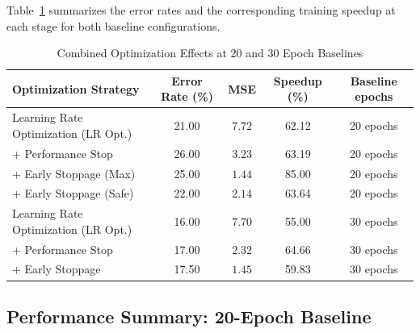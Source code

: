 Table~\ref{tab:combined_optimizations} summarizes the error rates and the corresponding training speedup at each stage for both baseline configurations.

\begin{table}[h!]
\centering
\begin{tabular}{|p{4.5cm}|c|c|c|c|}
\hline
\textbf{Optimization Strategy} & \textbf{Error Rate (\%)} & \textbf{MSE} & \textbf{Speedup (\%)} & \textbf{Baseline epochs} \\ \hline
Learning Rate Optimization (LR Opt.)         & 21.00  & \( 7.72  \) & 62.12 & 20 epochs \\ \hline
+ Performance Stop                           & 26.00 & \( 3.23  \)  & 63.19 & 20 epochs \\ \hline
+ Early Stoppage (Max)                       & 25.00 & \( 1.44  \)   & 85.00 & 20 epochs \\ \hline
+ Early Stoppage (Safe)                      & 22.00 & \( 2.14  \)  & 63.64 & 20 epochs \\ \hline
\hline
Learning Rate Optimization (LR Opt.)         & 16.00 & \( 7.70  \)  & 55.00 & 30 epochs \\ \hline
+ Performance Stop                           & 17.00 & \( 2.32  \)  & 64.66 & 30 epochs \\ \hline
+ Early Stoppage                             & 17.50 & \( 1.45  \)   & 59.83 & 30 epochs \\ \hline
\end{tabular}
\caption{Combined Optimization Effects at 20 and 30 Epoch Baselines}
\label{tab:combined_optimizations}
\end{table}

\subsection*{Performance Summary: 20-Epoch Baseline}

